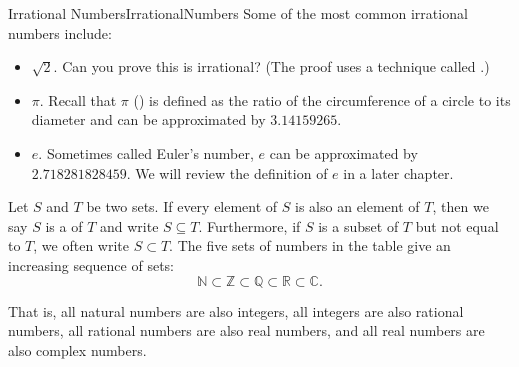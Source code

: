 \begin{example}{Irrational Numbers}{IrrationalNumbers}
Some of the most common irrational numbers include:
\begin{itemize}
	\item $\sqrt 2$.\quad 
			Can you prove this is irrational? (The proof uses a technique called .)
	\item $\pi$.\quad 
			Recall that $\pi$ () is defined as the ratio of the circumference of a circle to its diameter and can be approximated by $3.14159265$.
	\item $e$.\quad 
			Sometimes called Euler's number, $e$ can be approximated by $2.718281828459$. 
			We will review the definition of $e$ in a later chapter.
\end{itemize}
\end{example}

Let $S$ and $T$ be two sets. If every element of $S$ is also an element of $T$, then
we say $S$ is a  of $T$ and write $S\subseteq T$. Furthermore, if $S$ is
a subset of $T$ but not equal to $T$, we often write $S\subset T$.
The five sets of numbers in the table give an increasing sequence of sets:
\[ \mathbb{N} \subset \mathbb{Z} \subset \mathbb{Q} \subset \mathbb{R} \subset \mathbb{C}. \]

That is, all natural numbers are also integers, all integers are also rational numbers, all rational numbers are also real numbers, and all real numbers are also complex numbers.



